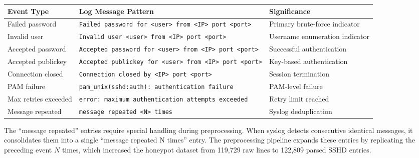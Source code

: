 \documentclass[
  a4paper]{report}
\newcounter{none} %
\begin{document}
{\def\LTcaptype{none} %
\begin{longtable}[]{@{}
  >{\raggedright\arraybackslash}p{}
  >{\raggedright\arraybackslash}p{}
  >{\raggedright\arraybackslash}p{}@{}}
\toprule\noalign{}
\begin{minipage}[b]{\linewidth}\raggedright
Event Type
\end{minipage} & \begin{minipage}[b]{\linewidth}\raggedright
Log Message Pattern
\end{minipage} & \begin{minipage}[b]{\linewidth}\raggedright
Significance
\end{minipage} \\
\midrule\noalign{}
\endhead
\bottomrule\noalign{}
\endlastfoot
Failed password &
\texttt{Failed\ password\ for\ \textless{}user\textgreater{}\ from\ \textless{}IP\textgreater{}\ port\ \textless{}port\textgreater{}}
& Primary brute-force indicator \\
Invalid user &
\texttt{Invalid\ user\ \textless{}user\textgreater{}\ from\ \textless{}IP\textgreater{}\ port\ \textless{}port\textgreater{}}
& Username enumeration indicator \\
Accepted password &
\texttt{Accepted\ password\ for\ \textless{}user\textgreater{}\ from\ \textless{}IP\textgreater{}\ port\ \textless{}port\textgreater{}}
& Successful authentication \\
Accepted publickey &
\texttt{Accepted\ publickey\ for\ \textless{}user\textgreater{}\ from\ \textless{}IP\textgreater{}\ port\ \textless{}port\textgreater{}}
& Key-based authentication \\
Connection closed &
\texttt{Connection\ closed\ by\ \textless{}IP\textgreater{}\ port\ \textless{}port\textgreater{}}
& Session termination \\
PAM failure & \texttt{pam\_unix(sshd:auth):\ authentication\ failure} &
PAM-level failure \\
Max retries exceeded &
\texttt{error:\ maximum\ authentication\ attempts\ exceeded} & Retry
limit reached \\
Message repeated &
\texttt{message\ repeated\ \textless{}N\textgreater{}\ times} & Syslog
deduplication \\
\end{longtable}
}

The ``message repeated'' entries require special handling during
preprocessing. When syslog detects consecutive identical messages, it
consolidates them into a single ``message repeated N times'' entry. The
preprocessing pipeline expands these entries by replicating the
preceding event \(N\) times, which increased the honeypot dataset from
119,729 raw lines to 122,809 parsed SSHD entries.
\end{document}
